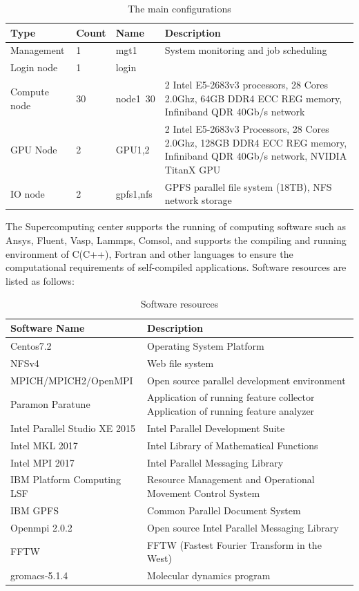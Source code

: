 \documentclass[a4paper,12pt]{article}
\begin{document}
\begin{table}[H]
\centering
\caption{The main configurations}
\vspace{0.5cm}
\begin{tabular}{|l|l|l|p{7cm}|}  %
\toprule
Type & Count & Name & Description \\
\midrule
Management & 1 & mgt1 & System monitoring and job scheduling \\
\hline
Login node & 1 & login &  \\
\hline
Compute node & 30 & node1~30 & 2 Intel E5-2683v3 processors, 28 Cores 2.0Ghz, 
64GB DDR4 ECC REG memory, Infiniband QDR 40Gb/s network \\  %
\hline
GPU Node & 2 & GPU1,2 & 2 Intel E5-2683v3 Processors, 28 Cores 2.0Ghz, 
128GB DDR4 ECC REG memory, Infiniband QDR 40Gb/s network, NVIDIA TitanX GPU \\  %
\hline
IO node & 2 & gpfs1,nfs & GPFS parallel file system (18TB), NFS network storage \\
\bottomrule
\end{tabular}
\end{table}

The Supercomputing center supports the running of computing software such as Ansys, Fluent, Vasp, Lammps, Comsol, and supports the compiling and running environment of C(C++), Fortran and other languages to ensure the computational requirements of self-compiled applications. Software resources are listed as follows:

\begin{table}[H]
\centering
\caption{Software resources}
\vspace{0.5cm}
\begin{tabular}{|l|p{8cm}|}
\toprule
Software Name & Description \\
\midrule
Centos7.2 & Operating System Platform \\
\hline
NFSv4 & Web file system \\
\hline
MPICH/MPICH2/OpenMPI & Open source parallel development environment \\
\hline
Paramon Paratune & Application of running feature collector Application of running feature analyzer \\
\hline
Intel Parallel Studio XE 2015 & Intel Parallel Development Suite \\
\hline
Intel MKL 2017 & Intel Library of Mathematical Functions \\
\hline
Intel MPI 2017 & Intel Parallel Messaging Library \\
\hline
IBM Platform Computing LSF & Resource Management and Operational Movement Control System \\
\hline
IBM GPFS & Common Parallel Document System \\
\hline
Openmpi 2.0.2 & Open source Intel Parallel Messaging Library \\
\hline
FFTW & FFTW (Fastest Fourier Transform in the West) \\
\hline
gromacs-5.1.4 & Molecular dynamics program \\
\bottomrule
\end{tabular}
\end{table}
\end{document}
